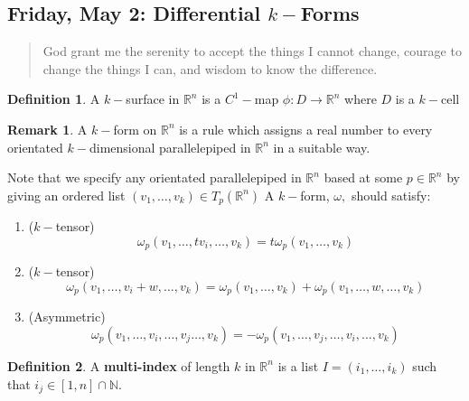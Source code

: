 \documentclass[10pt, oneside]{article}
\newcommand{\bbR}{\mathbb{R}}
\newcommand{\bbN}{\mathbb{N}}
\theoremstyle{definition}
\newtheorem{defn}{Definition}
\newtheorem{rem}{Remark}
\begin{document}
\newpage
\subsection*{Friday, May 2: Differential $k-$Forms}
\begin{quote}
    God grant me the serenity to accept the things I cannot change, courage to change the things I can, and wisdom to know the difference.
\end{quote}
\begin{defn}
    A $k-$surface in $\bbR^n$ is a $C^1-$map $\phi: D \to \bbR^n$ where $D$ is a $k-$cell
\end{defn}
\begin{rem}
    A $k-$form on $\bbR^n$ is a rule which assigns a real number to every orientated $k-$dimensional parallelepiped in $\bbR^n$ in a suitable way.

Note that we specify any orientated parallelepiped in $\bbR^n$ based at some $p \in \bbR^n$ by giving an ordered list $(v_1, \dots, v_k) \in T_p(\bbR^n)$ A $k-$form, $\omega,$ should satisfy:
\begin{enumerate}
    \item ($k-$tensor) \[\omega_p(v_1, \dots, tv_i, \dots, v_k) = t\omega_p(v_1, \dots, v_k)\]
    \item ($k-$tensor) \[\omega_p(v_1, \dots, v_i + w, \dots, v_k) = \omega_p(v_1, \dots, v_k) + \omega_p(v_1, \dots, w, \dots, v_k)\]
    \item (Asymmetric)
    \[\omega_p(v_1, \dots, v_i, \dots, v_j\dots, v_k) = -\omega_p(v_1, \dots, v_j, \dots, v_i,\dots, v_k)\]
\end{enumerate}
\end{rem}

\begin{defn}
    A \textbf{multi-index} of length $k$ in $\bbR^n$ is a list $I = (i_1, \dots, i_k)$ such that $i_j \in [1,n] \cap \bbN.$ 
\end{defn}
\end{document}
